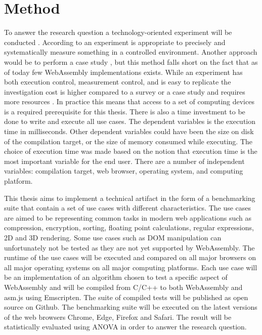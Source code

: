 \section{Method}
\label{method}

To answer the research question a technology-oriented experiment will be conducted \parencite{WohlinRunesonHostOhlssonRegnellWesslen2012}. According to \textcite{WohlinRunesonHostOhlssonRegnellWesslen2012} an experiment is appropriate to precisely and systematically measure something in a controlled environment. Another approach would be to perform a case study \parencite{WohlinRunesonHostOhlssonRegnellWesslen2012}, but this method falls short on the fact that as of today few WebAssembly implementations exists. While an experiment has both execution control, measurement control, and is easy to replicate the investigation cost is higher compared to a survey or a case study and requires more resources \parencite{WohlinRunesonHostOhlssonRegnellWesslen2012}. In practice this means that access to a set of computing devices is a required prerequisite for this thesis. There is also a time investment to be done to write and execute all use cases. The dependent variables is the execution time in milliseconds. Other dependent variables could have been the size on disk of the compilation target, or the size of memory consumed while executing. The choice of execution time was made based on the notion that execution time is the most important variable for the end user. There are a number of independent variables: compilation target, web browser, operating system, and computing platform.

This thesis aims to implement a technical artifact in the form of a benchmarking suite that contain a set of use cases with different characteristics. The use cases are aimed to be representing common tasks \parencite{WohlinRunesonHostOhlssonRegnellWesslen2012} in modern web applications such as compression, encryption, sorting, floating point calculations, regular expressions, 2D and 3D rendering. Some use cases such as DOM manipulation can unfortunately not be tested as they are not yet supported by WebAssembly. The runtime of the use cases will be executed and compared on all major browsers on all major operating systems on all major computing platforms. Each use case will be an implementation of an algorithm chosen to test a specific aspect of WebAssembly and will be compiled from C/C++ to both WebAssembly and asm.js using Emscripten. The suite of compiled tests will be published as open source on Github. The benchmarking suite will be executed on the latest versions of the web browsers Chrome, Edge, Firefox and Safari. The result will be statistically evaluated using ANOVA in order to answer the research question.

